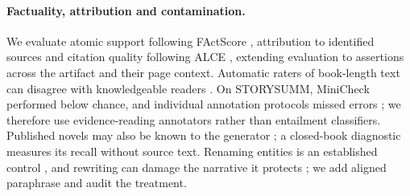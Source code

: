 \paragraph{Factuality, attribution and contamination.}
We evaluate atomic support following FActScore \citep{min2023factscore}, attribution to
identified sources \citep{rashkin2021ais} and citation quality following ALCE
\citep{gao2023alce}, extending evaluation to assertions across the artifact and their page
context. Automatic raters of book-length text can disagree with knowledgeable readers
\citep{kim2024fables}. On STORYSUMM, MiniCheck \citep{tang2024minicheck} performed below
chance, and individual annotation protocols missed errors \citep{subbiah2024storysumm}; we
therefore use evidence-reading annotators rather than entailment classifiers. Published
novels may also be known to the generator \citep{chang2023speak,cheng2025contamination}; a
closed-book diagnostic measures its recall without source text.\ifdefined\nwvtwo{}
Renaming entities is an established control \citep{gupta2025whodunit,zhang2024infinitebench},
and rewriting can damage the narrative it protects \citep{sun2025emperor}; we add aligned
paraphrase and audit the treatment.\fi